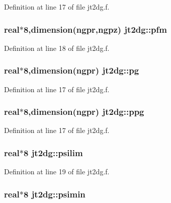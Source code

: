 Definition at line 17 of file jt2dg.f.\hypertarget{namespacejt2dg_b7a37a375ca78999b17c11ceea0bec58}{
\subsubsection[pfm]{\setlength{\rightskip}{0pt plus 5cm}real$\ast$8,dimension(ngpr,ngpz) {\bf jt2dg::pfm}}}
\label{namespacejt2dg_b7a37a375ca78999b17c11ceea0bec58}




Definition at line 18 of file jt2dg.f.\hypertarget{namespacejt2dg_08d804a6c5152c65e1500244fa1410f6}{
\subsubsection[pg]{\setlength{\rightskip}{0pt plus 5cm}real$\ast$8,dimension(ngpr) {\bf jt2dg::pg}}}
\label{namespacejt2dg_08d804a6c5152c65e1500244fa1410f6}




Definition at line 17 of file jt2dg.f.\hypertarget{namespacejt2dg_6f762b87bc8dd1ed612d879909319f97}{
\subsubsection[ppg]{\setlength{\rightskip}{0pt plus 5cm}real$\ast$8,dimension(ngpr) {\bf jt2dg::ppg}}}
\label{namespacejt2dg_6f762b87bc8dd1ed612d879909319f97}




Definition at line 17 of file jt2dg.f.\hypertarget{namespacejt2dg_14f47c1ae6f543fcfb7074e1fa879656}{
\subsubsection[psilim]{\setlength{\rightskip}{0pt plus 5cm}real$\ast$8 {\bf jt2dg::psilim}}}
\label{namespacejt2dg_14f47c1ae6f543fcfb7074e1fa879656}




Definition at line 19 of file jt2dg.f.\hypertarget{namespacejt2dg_c9e6897e44c92cd87f08bc39a66d332e}{
\subsubsection[psimin]{\setlength{\rightskip}{0pt plus 5cm}real$\ast$8 {\bf jt2dg::psimin}}}
\label{namespacejt2dg_c9e6897e44c92cd87f08bc39a66d332e}




